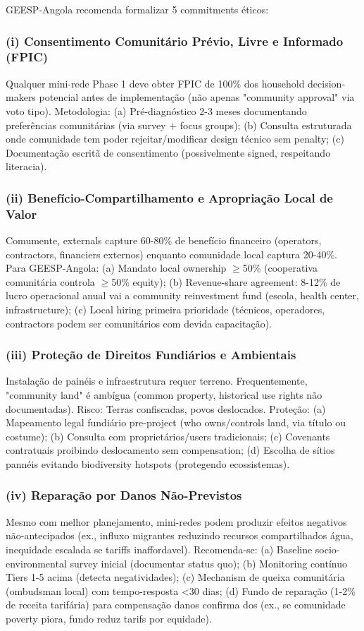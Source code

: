 \documentclass[12pt, a4paper]{article}
\begin{document}
{{{{{{{{{{{{GEESP-Angola recomenda formalizar 5 commitments éticos:

\subsubsection{(i) Consentimento Comunitário Prévio, Livre e Informado (FPIC)}
Qualquer mini-rede Phase 1 deve obter FPIC de 100\% dos household decision-makers potencial antes de implementação (não apenas "community approval" via voto tipo). Metodologia: (a) Pré-diagnóstico 2-3 meses documentando preferências comunitárias (via survey + focus groups); (b) Consulta estruturada onde comunidade tem poder rejeitar/modificar design técnico sem penalty; (c) Documentação escritã de consentimento (possivelmente signed, respeitando literacia).

\subsubsection{(ii) Benefício-Compartilhamento e Apropriação Local de Valor}
Comumente, externals capture 60-80\% de benefício financeiro (operators, contractors, financiers externos) enquanto comunidade local captura 20-40\%. Para GEESP-Angola: (a) Mandato local ownership $\geq$50\% (cooperativa comunitária controla $\geq$50\% equity); (b) Revenue-share agreement: 8-12\% de lucro operacional anual vai a community reinvestment fund (escola, health center, infrastructure); (c) Local hiring primeira prioridade (técnicos, operadores, contractors podem ser comunitários com devida capacitação).

\subsubsection{(iii) Proteção de Direitos Fundiários e Ambientais}
Instalação de painéis e infraestrutura requer terreno. Frequentemente, "community land" é ambígua (common property, historical use rights não documentadas). Risco: Terras confiscadas, povos deslocados. Proteção: (a) Mapeamento legal fundiário pre-project (who owns/controls land, via título ou costume); (b) Consulta com proprietários/users tradicionais; (c) Covenants contratuais proibindo deslocamento sem compensation; (d) Escolha de sítios pannéis evitando biodiversity hotspots (protegendo ecossistemas).

\subsubsection{(iv) Reparação por Danos Não-Previstos}
Mesmo com melhor planejamento,  mini-redes podem produzir efeitos negativos não-antecipados (ex., influxo migrantes reduzindo recursos compartilhados água, inequidade escalada se tariffs inaffordavel). Recomenda-se: (a) Baseline socio-environmental survey inicial (documentar status quo); (b) Monitoring contínuo Tiers 1-5 acima (detecta negatividades); (c) Mechanism de queixa comunitária (ombudsman local) com tempo-resposta <30 dias; (d) Fundo de reparação (1-2\% de receita tarifária) para compensação danos confirma dos (ex., se comunidade poverty piora, fundo reduz tarifs por equidade).

}}}}}}}}}}}}
\end{document}
